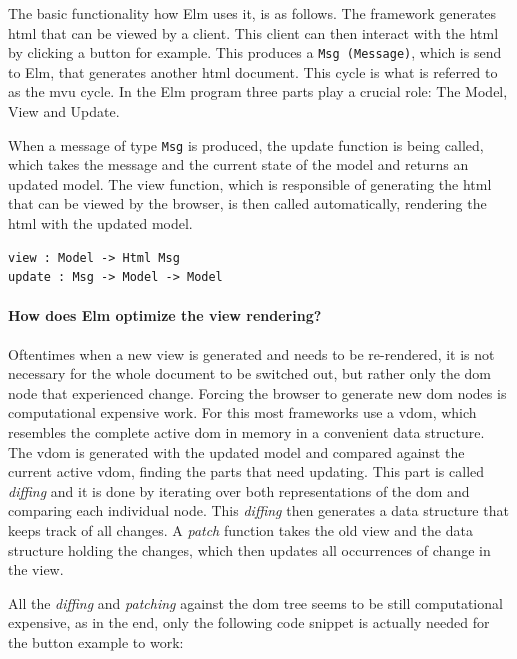 The basic functionality how Elm uses it, is as follows. The framework generates \gls{html} that can be viewed by a client. This client can then interact with the \gls{html} by clicking a button for example. This produces a \texttt{Msg (Message)}, which is send to Elm, that generates another \gls{html} document. This cycle is what is referred to as the \gls{mvu} cycle.
In the Elm program three parts play a crucial role: The Model, View and Update.

When a message of type \texttt{Msg} is produced, the update function is being called, which takes the message and the current state of the model and returns an updated model. The view function, which is responsible of generating the \gls{html} that can be viewed by the browser, is then called automatically, rendering the \gls{html} with the updated model.

\begin{lstlisting}[columns=fullflexible, label={view_model}, language=Other, caption={View, update and model and their types}]
view : Model -> Html Msg
update : Msg -> Model -> Model
\end{lstlisting}

\paragraph{How does Elm optimize the view rendering?}
Oftentimes when a new view is generated and needs to be re-rendered, it is not necessary for the whole document to be switched out, but rather only the \gls{dom} node that experienced change. Forcing the browser to generate new \gls{dom} nodes is computational expensive work.
For this most frameworks use a \gls{vdom}, which resembles the complete active \gls{dom} in memory in a convenient data structure. The \gls{vdom} is generated with the updated model and compared against the current active \gls{vdom}, finding the parts that need updating. This part is called \textit{diffing} and it is done by iterating over both representations of the \gls{dom} and comparing each individual node. This \textit{diffing} then generates a data structure that keeps track of all changes. A \textit{patch} function takes the old view and the data structure holding the changes, which then updates all occurrences of change in the view.

All the \textit{diffing} and \textit{patching} against the \gls{dom} tree seems to be still computational expensive, as in the end, only the following code snippet is actually needed for the button example to work:

